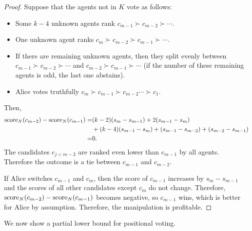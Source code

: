 \begin{proof}
Suppose that the agents not in $K$ vote as follows:
\begin{itemize}
\item Some $k-4$ unknown agents
rank $c_{m-1}\succ c_{m-2}\succ \cdots $.
\item One unknown agent ranks $c_m \succ c_{m-2} \succ c_{m-1}\succ \cdots $.
\item If there are remaining unknown
agents, then they split evenly between 
$c_{m-1}\succ c_{m-2}\succ \cdots $ and $c_{m-2}\succ c_{m-1}\succ \cdots $ 
(if the number of these remaining agents is odd, the last one abstains).
\item Alice votes truthfully $c_m\succ c_{m-1}\succ c_{m-2} \cdots \succ c_1$.
\end{itemize}
Then,
\begin{align*}
\operatorname{score}_N(c_{m-2}) - \operatorname{score}_N(c_{m-1})
=&
(k-2)(s_{m}-s_{m-1}) 
+ 2(s_{m-1}-s_{m})
\\
&+
(k-4)(s_{m-1}-s_{m}) 
+ (s_{m-1}-s_{m-2})
+ (s_{m-2}-s_{m-1})
\\
=&
0.
\end{align*}
The candidates $c_{j<m-2}$ are ranked even lower than $c_{m-1}$ by all agents. Therefore the outcome is a tie between $c_{m-1}$ and $c_{m-2}$.

If Alice switches $c_{m-1}$ and $c_m$, then the score of $c_{m-1}$ increases by $s_m-s_{m-1}$ and the scores of all other candidates except $c_m$ do not change. Therefore, 
$\operatorname{score}_N(c_{m-2}) - \operatorname{score}_N(c_{m-1})$ becomes negative, so $c_{m-1}$ wins, which is better for Alice by assumption.
Therefore, the manipulation is profitable.
\end{proof}
\fi


\iffalse
We now show a partial lower bound for positional voting.


